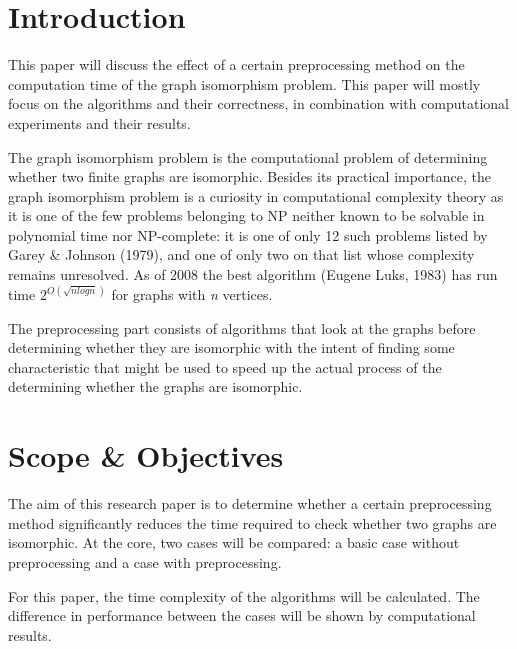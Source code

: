 \documentclass[twoside]{article}
\theoremstyle{definition}
\theoremstyle{plain}
\begin{document}
\begin{multicols}{2} %

\section{Introduction} 

This paper will discuss the effect of a certain preprocessing method on the computation time of the graph isomorphism problem. This paper will mostly focus on the algorithms and their correctness, in combination with computational experiments and their results.

The graph isomorphism problem is the computational problem of determining whether two finite graphs are isomorphic. Besides its practical importance, the graph isomorphism problem is a curiosity in computational complexity theory as it is one of the few problems belonging to NP neither known to be solvable in polynomial time nor NP-complete: it is one of only 12 such problems listed by Garey \& Johnson (1979)\cite{book:garyJohnson1979}, and one of only two on that list whose complexity remains unresolved. As of 2008 the best algorithm (Eugene Luks, 1983) has run time $2^{O(\sqrt{n log n})}$ for graphs with \emph{n} vertices.\cite{article:davidJohnson2005}\cite{inproceedings:babaiCodenotti2008}\cite{website:wikiGI}

The preprocessing part consists of algorithms that look at the graphs before determining whether they are isomorphic with the intent of finding some characteristic that might be used to speed up the actual process of the determining whether the graphs are isomorphic.


\section{Scope \& Objectives}

The aim of this research paper is to determine whether a certain preprocessing method significantly reduces the time required to check whether two graphs are isomorphic. At the core, two cases will be compared: a basic case without preprocessing and a case with preprocessing. 

For this paper, the time complexity of the algorithms will be calculated. The difference in performance between the cases will be shown by computational results.


\end{multicols}
\end{document}
